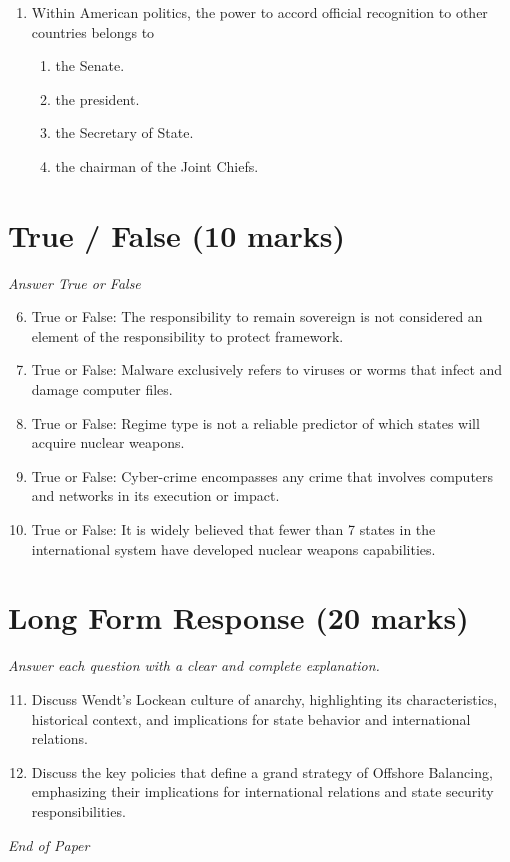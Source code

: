 \documentclass[12pt]{article}
\begin{document}
\begin{enumerate}[label=\arabic*.]
\begin{enumerate}[label=(\alph*)]
    \item The US unreservedly supported decolonization
    \item None of the above
\end{enumerate}
\item Within American politics, the power to accord official recognition to other countries belongs to
\begin{enumerate}[label=(\alph*)]
    \item the Senate.
    \item the president.
    \item the Secretary of State.
    \item the chairman of the Joint Chiefs.
\end{enumerate}
\end{enumerate}

\section*{True / False (10 marks)}
\textit{Answer True or False}
\begin{enumerate}[label=\arabic*.]
\setcounter{enumi}{5}
\item True or False: The responsibility to remain sovereign is not considered an element of the responsibility to protect framework.
\item True or False: Malware exclusively refers to viruses or worms that infect and damage computer files.
\item True or False: Regime type is not a reliable predictor of which states will acquire nuclear weapons.
\item True or False: Cyber-crime encompasses any crime that involves computers and networks in its execution or impact.
\item True or False: It is widely believed that fewer than 7 states in the international system have developed nuclear weapons capabilities.
\end{enumerate}

\section*{Long Form Response (20 marks)}
\textit{Answer each question with a clear and complete explanation.}
\begin{enumerate}[label=\arabic*.]
\setcounter{enumi}{10}
\item Discuss Wendt's Lockean culture of anarchy, highlighting its characteristics, historical context, and implications for state behavior and international relations.
\item Discuss the key policies that define a grand strategy of Offshore Balancing, emphasizing their implications for international relations and state security responsibilities.
\end{enumerate}

\vfill
\noindent\textit{End of Paper}
\end{document}
